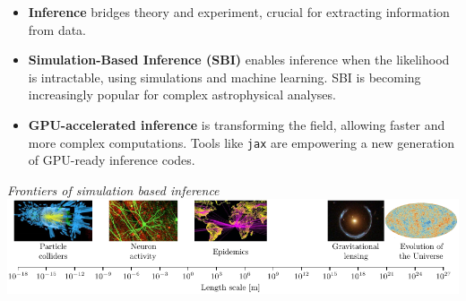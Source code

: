 \documentclass[aspectratio=169]{beamer}
\begin{document}
\begin{frame}
    \begin{itemize}
        \item \textbf{Inference} bridges theory and experiment, crucial for extracting information from data.
        \item \textbf{Simulation-Based Inference (SBI)} enables inference when the likelihood is intractable, using simulations and machine learning. SBI is becoming increasingly popular for complex astrophysical analyses.
        \item \textbf{GPU-accelerated inference} is transforming the field, allowing faster and more complex computations. Tools like \texttt{jax} are empowering a new generation of GPU-ready inference codes.
    \end{itemize}
    \hfill \textit{Frontiers of simulation based inference}~
    \includegraphics[width=\textwidth]{figures/sbi_range.pdf}
\end{frame}
\end{document}
